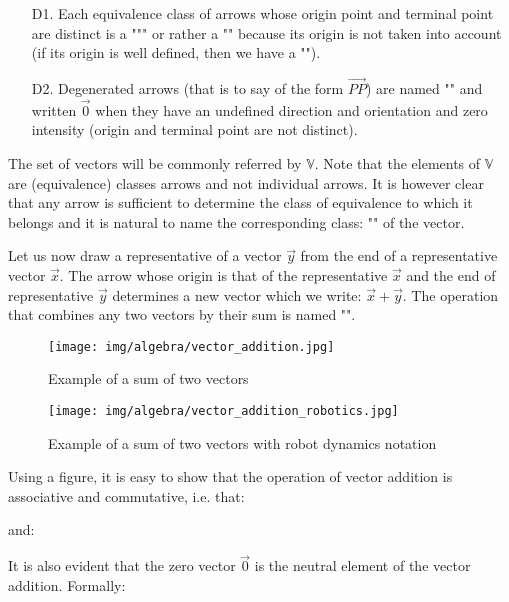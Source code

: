 \begin{enumerate}
	\item[D1.]Each equivalence class of arrows whose origin point and terminal point are distinct is a ""\label{vector}" or rather a "" because its origin is not taken into account (if its origin is well defined, then we have a "").
	
	\item[D2.]Degenerated arrows (that is to say of the form $\overrightarrow{PP}$) are named "" and written $\vec{0}$ when they have an undefined direction and orientation and zero intensity (origin and terminal point are not distinct).
\end{enumerate}	

The set of vectors will be commonly referred  by $\mathbb{V}$. Note that the elements of $\mathbb{V}$ are (equivalence) classes arrows and not individual arrows. It is however clear that any arrow is sufficient to determine the class of equivalence to which it belongs and it is natural to name the corresponding class: "" of the vector.

Let us now draw a representative of a vector $\vec{y}$ from the end of a representative vector $\vec{x}$. The arrow whose origin is that of the representative $\vec{x}$ and the end of representative $\vec{y}$ determines a new vector which we write: $\vec{x}+ \vec{y}$. The operation that combines any two vectors by their sum is named "".

\begin{figure}[H]
\centering
\texttt{[image: img/algebra/vector\_addition.jpg]}
\caption{Example of a sum of two vectors}
\end{figure}

\begin{figure}[H]
\centering
\texttt{[image: img/algebra/vector\_addition\_robotics.jpg]}
\caption{Example of a sum of two vectors with robot dynamics notation}
\end{figure}

Using a figure, it is easy to show that the operation of vector addition is associative and commutative, i.e. that:
	
and:
	
It is also evident that the zero vector $\vec{0}$ is the neutral element of the vector addition. Formally:
	
